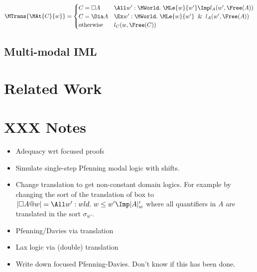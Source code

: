 \[
\MTrans{\MAt{C}{w}} =
\begin{cases}
  C=\Box A & \All w':\MWorld.~\MLe{w}{w'}\Imp l_A(w', \Free(A)) \\
  C=\Dia A & \Ex w':\MWorld.~\MLe{w}{w'}\And l_A(w', \Free(A)) \\
  \mbox{otherwise} & l_{C}(w, \Free(C))
\end{cases}
\]




\subsection{Multi-modal IML}

\section{Related Work}

\cite{Alechina.2006.JAL}
\cite{Amati.1994.SL}
\cite{Pfenning.2010.ModalLogic}

\section{XXX Notes}

\begin{itemize}
\item Adequacy wrt focused proofs
\item Simulate single-step Pfenning modal logic with shifts.
\item Change translation to get non-constant domain logics.
  For example by changing the sort of the translation of box to
  $|\Box A @ w| = \All w':wld.~w\le w'\Imp |A|_w'$ where all quantifiers
  in $A$ are translated in the sort $\sigma_{w'}$.
\item Pfenning/Davies via translation
\item Lax logic via (double) translation
\item Write down focused Pfenning-Davies.  Don't know if this has been done.
\end{itemize}


